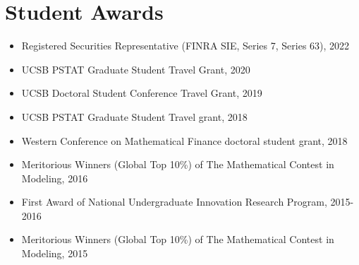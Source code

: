 \documentclass[11pt,a4paper,roman]{moderncv}
\begin{document}
\section{Student Awards}
\begin{itemize}



\item Registered Securities Representative (FINRA SIE, Series 7, Series 63), 2022

\vspace{1pt}



\item{ UCSB PSTAT Graduate Student Travel Grant, 2020}

\vspace{1pt}

\item{ UCSB Doctoral Student Conference Travel Grant, 2019}

\vspace{1pt}

\item{ UCSB PSTAT Graduate Student Travel grant, 2018}

\vspace{1pt}

\item{Western Conference on Mathematical Finance doctoral student grant, 2018}

\vspace{1pt}
\item Meritorious Winners (Global Top 10\%) of The Mathematical Contest in Modeling, 2016
\vspace{1pt}
\item{First Award of National Undergraduate Innovation Research Program, 2015-2016}

\vspace{1pt}

\item Meritorious Winners (Global Top 10\%) of The Mathematical Contest in Modeling, 2015


\end{itemize}
\end{document}
